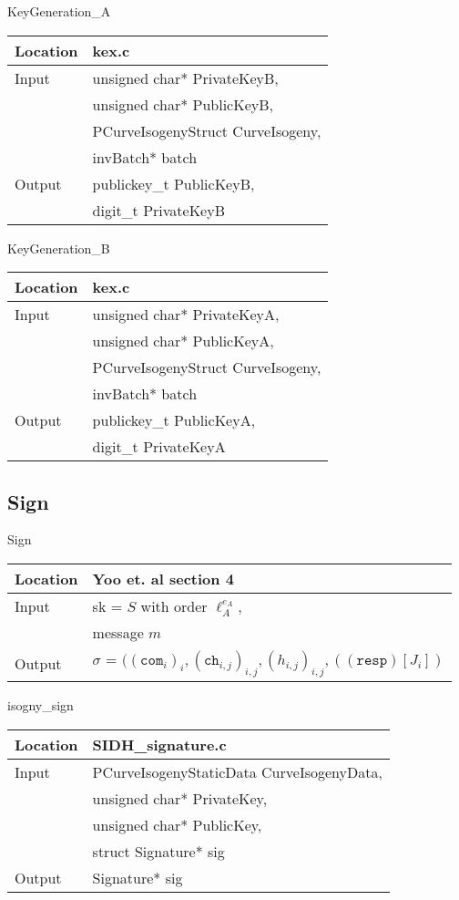 \documentclass[10pt]{article}
\begin{document}
\vspace{5mm}

\parbox{.45\linewidth}{
\centering
KeyGeneration\_A
\begin{tabular}{@{}ll@{}}
	\toprule
	Location & kex.c \\
	\midrule
	Input & unsigned char* PrivateKeyB,\\
	& unsigned char* PublicKeyB,\\
	& PCurveIsogenyStruct CurveIsogeny,\\
	& invBatch* batch\\
	\midrule
	Output & publickey\_t PublicKeyB,\\
	& digit\_t PrivateKeyB\\
	\bottomrule
\end{tabular}}
\hfill
\parbox{.45\linewidth}{
\centering
KeyGeneration\_B
\begin{tabular}{@{}ll@{}}
	\toprule
	Location & kex.c \\
	\midrule
	Input & unsigned char* PrivateKeyA,\\
	& unsigned char* PublicKeyA,\\
	& PCurveIsogenyStruct CurveIsogeny,\\
	& invBatch* batch\\
	\midrule
	Output & publickey\_t PublicKeyA,\\
	& digit\_t PrivateKeyA\\
	\bottomrule
\end{tabular}}

\subsection{Sign}

\parbox[t]{.40\linewidth}{
\centering
Sign
\begin{tabular}{@{}ll@{}}
	\toprule
	Location & Yoo et. al section 4 \\
	\midrule
	Input & sk = $S$ with order $\ell^{e_{A}}_{A}$,\\
	& message $m$\\
	\midrule
	Output & $\sigma$ = $((\texttt{com}_{i})_{i}, (\texttt{ch}_{i,j})_{i,j}, (h_{i,j})_{i,j}, ((\texttt{resp})[J_{i}])$\\
	\bottomrule
\end{tabular}}
\hfill
\parbox[t]{.40\linewidth}{
\centering
isogny\_sign
\begin{tabular}{@{}ll@{}}
	\toprule
	Location & SIDH\_signature.c \\
	\midrule
	Input & PCurveIsogenyStaticData CurveIsogenyData,\\
	& unsigned char* PrivateKey,\\
	& unsigned char* PublicKey,\\
	& struct Signature* sig\\
	\midrule
	Output & Signature* sig\\
	\bottomrule
\end{tabular}}
\end{document}
